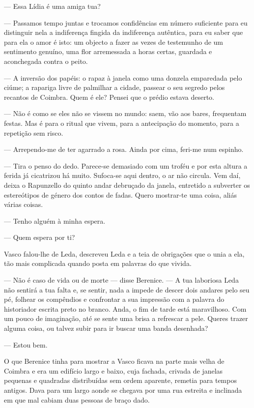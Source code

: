 --- Essa Lídia é uma amiga tua?

--- Passamos tempo juntas e trocamos confidências em número suficiente
  para eu distinguir nela a indiferença fingida da indiferença
  autêntica, para eu saber que para ela o amor é isto: um objecto a
  fazer as vezes de testemunho de um sentimento genuíno, uma flor
  arremessada a horas certas, guardada e aconchegada contra o peito.

--- A inversão dos papéis: o rapaz à janela como uma donzela emparedada
  pelo ciúme; a rapariga livre de palmilhar a cidade, passear o seu
  segredo pelos recantos de Coimbra. Quem é ele? Pensei que o prédio
  estava deserto.

--- Não é como se eles não se vissem no mundo: saem, vão aos bares,
  frequentam festas. Mas é para o ritual que vivem, para a antecipação
  do momento, para a repetição sem risco.

--- Arrependo-me de ter agarrado a rosa. Ainda por cima, feri-me num
  espinho.

--- Tira o penso do dedo. Parece-se demasiado com um troféu e por esta
altura a ferida já cicatrizou há muito. Sufoca-se aqui dentro, o ar
não circula. Vem daí, deixa o Rapunzello do quinto
andar debruçado da janela, entretido a subverter os estereótipos de
género dos contos de fadas. Quero mostrar-te uma coisa, aliás várias
coisas.

--- Tenho alguém à minha espera.

--- Quem espera por ti?


Vasco falou-lhe de Leda, descreveu Leda e a teia de obrigações que o
unia a ela, tão mais complicada quando posta em palavras do que vivida.

--- Não é caso de vida ou de morte --- disse Berenice. --- A tua laboriosa
  Leda não sentirá a tua falta e, se sentir, nada a impede de descer
  dois andares pelo seu pé, folhear os compêndios e confrontar a sua
  impressão com a palavra do historiador escrita preto no branco.
  Anda, o fim de tarde está maravilhoso. Com um pouco de imaginação,
  até se sente uma brisa a refrescar a pele. Queres trazer alguma coisa,
  ou talvez subir para ir buscar uma banda desenhada?

--- Estou bem.


O que Berenice tinha para mostrar a Vasco ficava na parte mais velha de
Coimbra e era um edifício largo e baixo, cuja fachada, crivada de
janelas pequenas e quadradas distribuídas sem ordem aparente, remetia
para tempos antigos. Dava para um largo aonde se chegava por uma rua
estreita e inclinada em que mal cabiam duas pessoas de braço dado.

